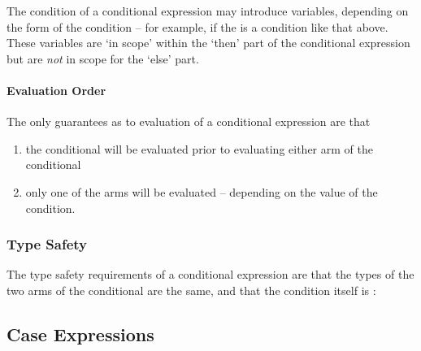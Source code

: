 The condition of a conditional expression may introduce variables, depending on the form of the condition -- for example, if the  is a  condition like that above. These variables are `in scope' within the `then' part of the conditional expression but are \emph{not} in scope for the `else' part.

\paragraph{Evaluation Order}
The only guarantees as to evaluation of a conditional expression are that
\begin{enumerate}
\item the conditional will be evaluated prior to evaluating either arm of the conditional
\item only one of the arms will be evaluated -- depending on the value of the condition.
\end{enumerate}

\subsubsection{Type Safety}
The type safety requirements of a conditional expression are that the types of the two arms of the conditional are the same, and that the condition itself is \safeinf{}:

\begin{prooftree}
\end{prooftree}


\subsection{Case Expressions}
\label{caseExpression}

